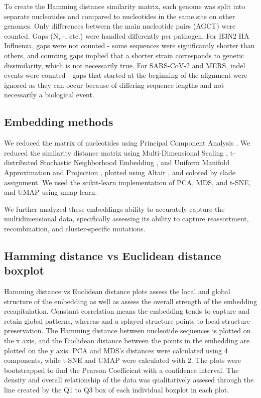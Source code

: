 \documentclass[10pt,letterpaper]{article}
\begin{document}
To create the Hamming distance similarity matrix, each genome was split into separate nucleotides and compared to nucleotides in the same site on other genomes.
Only differences between the main nucleotide pairs (AGCT) were counted.
Gaps (N, -, etc.) were handled differently per pathogen.
For H3N2 HA Influenza, gaps were not counted - some sequences were significantly shorter than others, and counting gaps implied that a shorter strain corresponds to genetic dissimilarity, which is not necessarily true.
For SARS-CoV-2 and MERS, indel events were counted - gaps that started at the beginning of the alignment were ignored as they can occur because of differing sequence lengths and not necessarily a biological event.

\subsection*{Embedding methods}
We reduced the matrix of nucleotides using Principal Component Analysis \cite{jolliffe_cadima_2016}.
We reduced the similarity distance matrix using Multi-Dimensional Scaling \cite{hout_papesh_goldinger_2012}, t-distributed Stochastic Neighborhood Embedding \cite{maaten2008visualizing}, and Uniform Manifold Approximation and Projection \cite{lel2018umap}, plotted using Altair \cite{VanderPlas2018}, and colored by clade assignment.
We used the scikit-learn implementation of PCA, MDS, and t-SNE, and UMAP using umap-learn.

We further analyzed these embeddings ability to accurately capture the multidimensional data, specifically assessing its ability to capture reassortment, recombination, and cluster-specific mutations.

\subsection*{Hamming distance vs Euclidean distance boxplot}

Hamming distance vs Euclidean distance plots assess the local and global structure of the embedding as well as assess the overall strength of the embedding recapitulation.
Constant correlation means the embedding tends to capture and retain global patterns, whereas and a splayed structure points to local structure preservation.
The Hamming distance between nucleotide sequences is plotted on the x axis, and the Euclidean distance between the points in the embedding are plotted on the y axis.
PCA and MDS's distances were calculated using 4 components, while t-SNE and UMAP were calculated with 2.
The plots were bootstrapped to find the Pearson Coefficient with a confidence interval.
The density and overall relationship of the data was qualitatively assesed through the line created by the Q1 to Q3 box of each individual boxplot in each plot.
\end{document}
